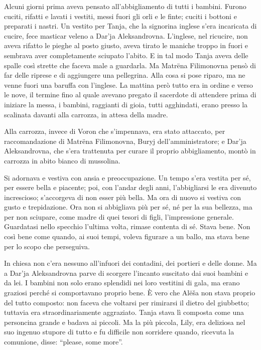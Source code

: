 Alcuni giorni prima aveva pensato all'abbigliamento di tutti i bambini. Furono cuciti, rifatti e lavati i vestiti, messi fuori gli orli e le finte; cuciti i bottoni e preparati i nastri. Un vestito per Tanja, che la signorina inglese s'era incaricata di cucire, fece masticar veleno a Dar'ja Aleksandrovna. L'inglese, nel ricucire, non aveva rifatto le pieghe al posto giusto, aveva tirato le maniche troppo in fuori e sembrava aver completamente sciupato l'abito. E in tal modo Tanja aveva delle spalle così strette che faceva male a guardarla. Ma Matrëna Filimonovna pensò di far delle riprese e di aggiungere una pellegrina. Alla cosa si pose riparo, ma ne venne fuori una baruffa con l'inglese. La mattina però tutto era in ordine e verso le nove, il termine fino al quale avevano pregato il sacerdote di attendere prima di iniziare la messa, i bambini, raggianti di gioia, tutti agghindati, erano presso la scalinata davanti alla carrozza, in attesa della madre. 

Alla carrozza, invece di Voron che s'impennava, era stato attaccato, per raccomandazione di Matrëna Filimonovna, Buryj dell'amministratore; e Dar'ja Aleksandrovna, che s'era trattenuta per curare il proprio abbigliamento, montò in carrozza in abito bianco di mussolina. 

Si adornava e vestiva con ansia e preoccupazione. Un tempo s'era vestita per sé, per essere bella e piacente; poi, con l'andar degli anni, l'abbigliarsi le era divenuto increscioso; s'accorgeva di non esser più bella. Ma ora di nuovo si vestiva con gusto e trepidazione. Ora non si abbigliava più per sé, né per la sua bellezza, ma per non sciupare, come madre di quei tesori di figli, l'impressione generale. Guardatasi nello specchio l'ultima volta, rimase contenta di sé. Stava bene. Non così bene come quando, ai suoi tempi, voleva figurare a un ballo, ma stava bene per lo scopo che perseguiva. 

In chiesa non c'era nessuno all'infuori dei contadini, dei portieri e delle donne. Ma a Dar'ja Aleksandrovna parve di scorgere l'incanto suscitato dai suoi bambini e da lei. I bambini non solo erano splendidi nei loro vestitini di gala, ma erano graziosi perché si comportavano proprio bene. È vero che Alëša non stava proprio del tutto composto: non faceva che voltarsi per rimirarsi il dietro del giubbetto; tuttavia era straordinariamente aggraziato. Tanja stava lì composta come una personcina grande e badava ai piccoli. Ma la più piccola, Lily, era deliziosa nel suo ingenuo stupore di tutto e fu difficile non sorridere quando, ricevuta la comunione, disse: ``please, some more''. 

